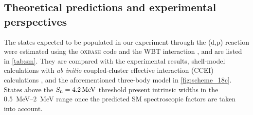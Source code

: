 \documentclass[a4paper, 10pt]{article}
\newcommand{\iso}[2]{\ce{^{#1}#2}}
\newcommand{\sn}{\ensuremath{S_{\text{n}}}\xspace}
\begin{document}
\subsection{Theoretical predictions and experimental perspectives}
The states expected to be populated in our experiment through the \iso{17}{C}(d,p)\iso{18}{C} reaction were estimated using the \textsc{oxbash} code and the WBT interaction \cite{warburton1992}, and are listed in \autoref{tab:sm}. They are compared with the experimental results, shell-model calculations with \textit{ab initio} coupled-cluster effective interaction (CCEI) calculations \cite{jansen2014}, and the aforementioned three-body model \cite{yakhelef2010} in \autoref{fig:scheme_18c}. States above the $\sn = \qtylist{4.2}{\MeV}$ threshold present intrinsic widths in the \qtyrange{0.5}{2}{\MeV} range once the predicted SM spectroscopic factors are taken into account.
\end{document}
